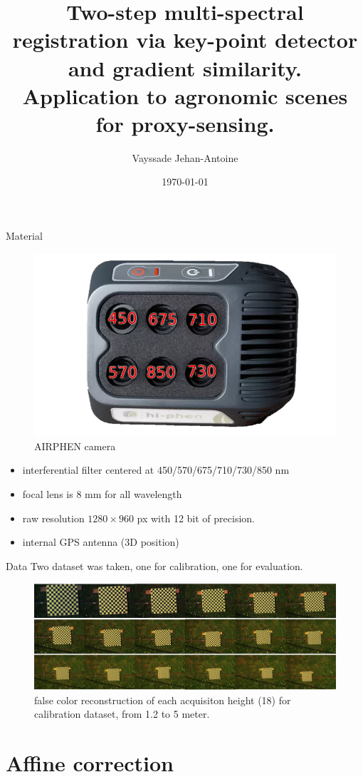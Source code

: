 \documentclass{beamer}
\title{
	Two-step multi-spectral registration via key-point detector and gradient similarity. \\
	\vspace{1em}
	Application to agronomic scenes for proxy-sensing.
}
\date{\today}
\author{Vayssade Jehan-Antoine}
\institute{\url{jehan-antoine.vayssade@inra.fr}}
\begin{document}
	\maketitle
	
		\begin{frame}{Material}
			\begin{figure}
				\includegraphics[width=0.4\linewidth]{../figures/airphen-detail4.png}
				\caption{AIRPHEN camera}
			\end{figure}
			\begin{itemize}
				\item interferential filter centered at 450/570/675/710/730/850 nm
				\item focal lens is 8 mm for all wavelength
				\item raw resolution $1280 \times 960$ px with 12 bit of precision.
				\item internal GPS antenna (3D position)
			\end{itemize}
		\end{frame}
	
		\begin{frame}{Data}
			Two dataset was taken, one for calibration, one for evaluation.
			\begin{figure}
				\includegraphics[width=\linewidth]{../figures/calibration-height.jpg}
				\caption{false color reconstruction of each acquisiton height (18) for calibration dataset, from 1.2 to 5 meter.}
			\end{figure}
		\end{frame}
	
	\section{Affine correction}
	
\end{document}

